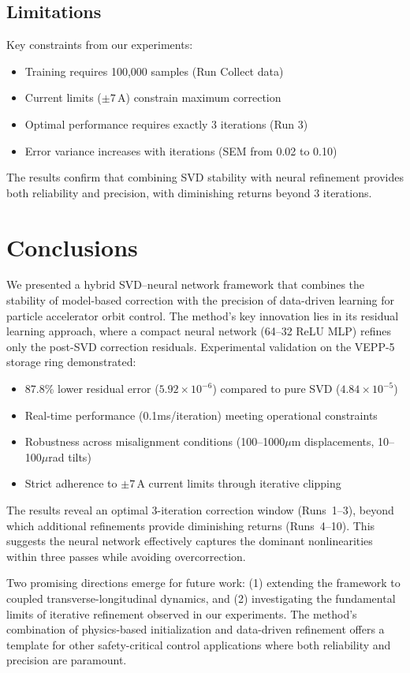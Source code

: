 \documentclass{article} %
\begin{document}
\subsection{Limitations}
Key constraints from our experiments:
\begin{itemize}
    \item Training requires 100,000 samples (Run Collect data)
    \item Current limits ($\pm7$\,A) constrain maximum correction
    \item Optimal performance requires exactly 3 iterations (Run 3)
    \item Error variance increases with iterations (SEM from 0.02 to 0.10)
\end{itemize}

The results confirm that combining SVD stability with neural refinement provides both reliability and precision, with diminishing returns beyond 3 iterations.

\section{Conclusions}
\label{sec:conclusion}

We presented a hybrid SVD--neural network framework that combines the stability of model-based correction with the precision of data-driven learning for particle accelerator orbit control. The method's key innovation lies in its residual learning approach, where a compact neural network (64--32 ReLU MLP) refines only the post-SVD correction residuals. Experimental validation on the VEPP-5 storage ring demonstrated:

\begin{itemize}
    \item 87.8\% lower residual error ($5.92 \times 10^{-6}$) compared to pure SVD ($4.84 \times 10^{-5}$)
    \item Real-time performance (0.1ms/iteration) meeting operational constraints
    \item Robustness across misalignment conditions (100--1000$\mu$m displacements, 10--100$\mu$rad tilts)
    \item Strict adherence to $\pm7$\,A current limits through iterative clipping
\end{itemize}

The results reveal an optimal 3-iteration correction window (Runs~1--3), beyond which additional refinements provide diminishing returns (Runs~4--10). This suggests the neural network effectively captures the dominant nonlinearities within three passes while avoiding overcorrection.

Two promising directions emerge for future work: (1) extending the framework to coupled transverse-longitudinal dynamics, and (2) investigating the fundamental limits of iterative refinement observed in our experiments. The method's combination of physics-based initialization and data-driven refinement offers a template for other safety-critical control applications where both reliability and precision are paramount.



\end{document}
